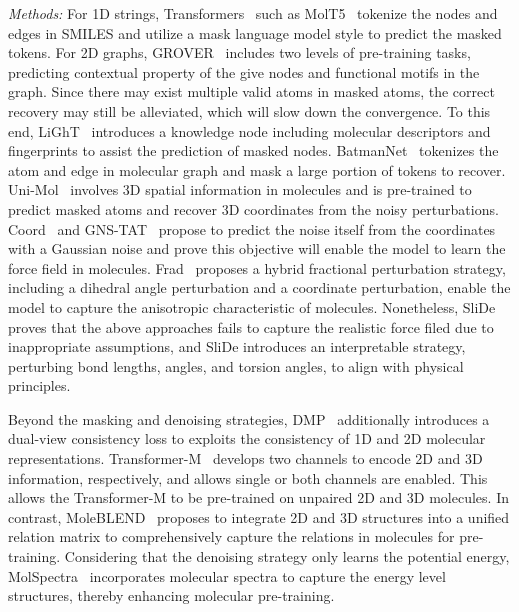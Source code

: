 \textit{Methods:}
For 1D strings, Transformers~\cite{zhang2025atomas} such as MolT5~\cite{edwards-etal-2022-translation} tokenize the nodes and edges in SMILES and utilize a mask language model style to predict the masked tokens. For 2D graphs, GROVER~\cite{rong2020self} includes two levels of pre-training tasks, predicting contextual property of the give nodes and functional motifs in the graph. 
Since there may exist multiple valid atoms in masked atoms, the correct recovery may still be alleviated, which will slow down the convergence. To this end, LiGhT~\cite{li2022kpgt} introduces a knowledge node including molecular descriptors and fingerprints to assist the prediction of masked nodes.
BatmanNet~\cite{wang2024batmannet} tokenizes the atom and edge in molecular graph and mask a large portion of tokens to recover. 
Uni-Mol~\cite{zhou2023unimol} involves 3D spatial information in molecules and is pre-trained to predict masked atoms and recover 3D coordinates from the noisy perturbations.
Coord~\cite{Coord} and GNS-TAT~\cite{zaidi2023pretraining} propose to predict the noise itself from the coordinates with a Gaussian noise and prove this objective will enable the model to learn the force field in molecules.
Frad~\cite{feng2023fractional} proposes a hybrid fractional perturbation strategy, including a dihedral angle perturbation and a  coordinate perturbation, enable the model to capture the anisotropic characteristic of molecules.
Nonetheless, SliDe~\cite{ni2024sliced} proves that the above approaches fails to capture the realistic force filed due to inappropriate assumptions, and SliDe introduces an  interpretable strategy, perturbing bond lengths, angles, and torsion angles, to align with physical principles.

Beyond the masking and denoising strategies, DMP~\cite{zhu2023dual} additionally introduces a dual-view consistency loss to exploits the consistency of 1D and 2D molecular representations. 
Transformer-M~\cite{luo2023one} develops two channels to encode 2D and 3D information, respectively, and allows single or both channels are enabled. This allows the Transformer-M to be pre-trained on unpaired 2D and 3D molecules.
In contrast, MoleBLEND~\cite{yu2024multimodal} proposes to integrate 2D and 3D structures into a unified relation matrix to comprehensively capture the relations in molecules for pre-training.
Considering that the denoising strategy only learns the potential energy, MolSpectra~\cite{MolSpectra} incorporates molecular spectra to capture the energy level structures, thereby enhancing molecular pre-training.



